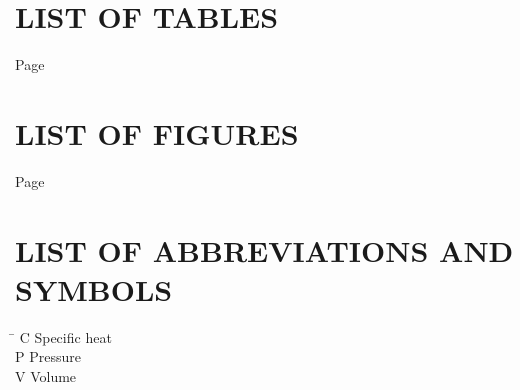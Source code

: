 
\cleardoublepage
\makeatletter
\chapter*{LIST OF TABLES}
\vspace{0pt}
\hfill{Page}\par
{}
\makeatother
\cleardoublepage

\makeatletter
\chapter*{LIST OF FIGURES}
\vspace{0pt}
\hfill{Page}\par
{}
\makeatother

\cleardoublepage
\makeatletter
\chapter*{LIST OF ABBREVIATIONS AND SYMBOLS}

\vspace{0pt}
\noindent
\begin{tabbing}
\hspace{2.5cm}\=\kill
C \> Specific heat \\
P \> Pressure \\
V \> Volume
\end{tabbing}
\makeatother
